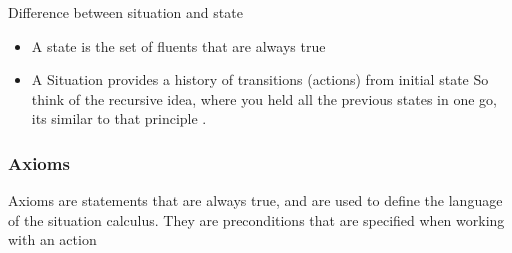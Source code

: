 \documentclass{article}
\theoremstyle{mytheoremstyle}
\theoremstyle{mytheoremstyle}
\theoremstyle{myproblemstyle}
\begin{document}
\begin{definition}
	Difference between situation and state \\
	\begin{itemize}
		\item A state is the set of fluents that are always true
		\item A Situation provides a history of transitions (actions) from initial state
		      So think of the recursive idea, where you held all the previous states in one go, its similar to that principle .
	\end{itemize}
\end{definition}
\subsubsection{Axioms}
Axioms are statements that are always true, and are used to define the language of the situation calculus.
They are preconditions that are specified when working with an action
\end{document}
